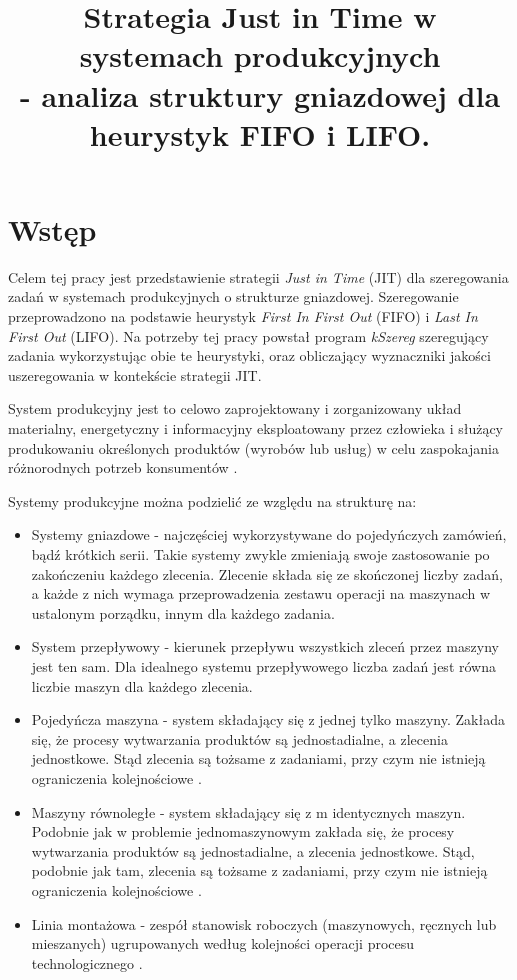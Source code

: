 \documentclass[twoside]{kInzynierka}
\title{Strategia Just in Time w systemach produkcyjnych\\ - analiza struktury gniazdowej dla heurystyk FIFO i LIFO.}
\begin{document}
\section        {Wstęp}
Celem tej pracy jest przedstawienie strategii \emph{Just in Time} (JIT) dla szeregowania zadań w systemach produkcyjnych o strukturze gniazdowej. Szeregowanie przeprowadzono na podstawie heurystyk \emph{First In First Out} (FIFO) i \emph{Last In First Out} (LIFO). Na potrzeby tej pracy powstał program \emph{kSzereg} szeregujący zadania wykorzystując obie te heurystyki, oraz obliczający wyznaczniki jakości uszeregowania w kontekście strategii JIT.

System produkcyjny jest to celowo zaprojektowany i zorganizowany układ materialny, energetyczny i informacyjny eksploatowany przez człowieka i służący produkowaniu określonych produktów (wyrobów lub usług) w celu zaspokajania różnorodnych potrzeb konsumentów \cite{pastuszak}.

Systemy produkcyjne można podzielić ze względu na strukturę na:

\begin{itemize}
\item Systemy gniazdowe - najczęściej wykorzystywane do pojedyńczych zamówień, bądź krótkich serii. Takie systemy zwykle zmieniają swoje zastosowanie po zakończeniu każdego zlecenia. Zlecenie składa się ze skończonej liczby zadań, a każde z nich wymaga przeprowadzenia zestawu operacji na maszynach w ustalonym porządku, innym dla każdego zadania.
\item System przepływowy - kierunek przepływu wszystkich zleceń przez maszyny jest ten sam. Dla idealnego systemu przepływowego liczba zadań jest równa liczbie maszyn dla każdego zlecenia. \cite{grzechca}
\item Pojedyńcza maszyna - system składający się z jednej tylko maszyny. Zakłada się, że procesy wytwarzania produktów są jednostadialne, a zlecenia jednostkowe. Stąd zlecenia są tożsame z zadaniami, przy czym nie istnieją ograniczenia kolejnościowe \cite{grzechca}.
\item Maszyny równoległe - system składający się z m identycznych maszyn. Podobnie jak w problemie jednomaszynowym zakłada się, że procesy wytwarzania produktów są jednostadialne, a zlecenia jednostkowe. Stąd, podobnie jak tam, zlecenia są tożsame z zadaniami, przy czym nie istnieją ograniczenia kolejnościowe \cite{grzechca}.
\item Linia montażowa -  zespół stanowisk roboczych (maszynowych, ręcznych lub mieszanych) ugrupowanych według kolejności operacji procesu technologicznego \cite{wiki}.
\end{itemize}
\end{document}
